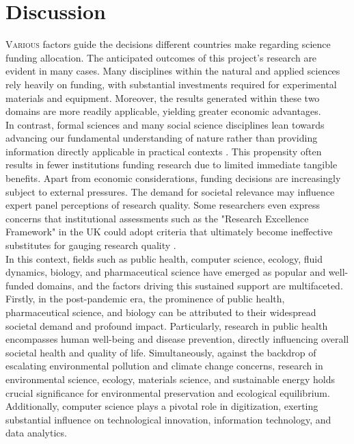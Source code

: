 \chapter{Discussion}
\lettrine[lines=1]{V}{arious}
factors guide the decisions different countries make regarding science funding allocation. The anticipated outcomes of this project's research are evident in many cases. Many disciplines within the natural and applied sciences rely heavily on funding, with substantial investments required for experimental materials and equipment. Moreover, the results generated within these two domains are more readily applicable, yielding greater economic advantages.\\

In contrast, formal sciences and many social science disciplines lean towards advancing our fundamental understanding of nature rather than providing information directly applicable in practical contexts \citep{shaw2022revisiting}. This propensity often results in fewer institutions funding research due to limited immediate tangible benefits. Apart from economic considerations, funding decisions are increasingly subject to external pressures. The demand for societal relevance may influence expert panel perceptions of research quality. Some researchers even express concerns that institutional assessments such as the "Research Excellence Framework" in the UK could adopt criteria that ultimately become ineffective substitutes for gauging research quality \citep{meirmans2019science}.\\

In this context, fields such as public health, computer science, ecology, fluid dynamics, biology, and pharmaceutical science have emerged as popular and well-funded domains, and the factors driving this sustained support are multifaceted. Firstly, in the post-pandemic era, the prominence of public health, pharmaceutical science, and biology can be attributed to their widespread societal demand and profound impact. Particularly, research in public health encompasses human well-being and disease prevention, directly influencing overall societal health and quality of life. Simultaneously, against the backdrop of escalating environmental pollution and climate change concerns, research in environmental science, ecology, materials science, and sustainable energy holds crucial significance for environmental preservation and ecological equilibrium. Additionally, computer science plays a pivotal role in digitization, exerting substantial influence on technological innovation, information technology, and data analytics.\\

